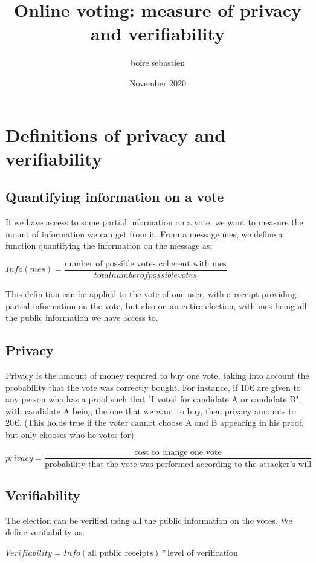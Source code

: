 \documentclass{article}
\title{Online voting: measure of privacy and verifiability}
\author{boire.sebastien }
\date{November 2020}
\begin{document}
\maketitle


\section{Definitions of privacy and verifiability}

\subsection{Quantifying information on a vote}

If we have access to some partial information on a vote, we want to measure the mount of information we can get from it. From a message mes, we define a function quantifying the information on the message as:

$Info(mes)=\dfrac{\text{number of possible votes coherent with mes}}{total number of possible votes}$

This definition can be applied to the vote of one user, with a receipt providing partial information on the vote, but also on an entire election, with mes being all the public information we have access to.


\subsection{Privacy}

Privacy is the amount of money required to buy one vote, taking into account the probability that the vote was correctly bought. For instance, if 10€ are given to any person who has a proof such that "I voted for candidate A or candidate B", with candidate A being the one that we want to buy, then privacy amounts to 20€. (This holds true if the voter cannot choose A and B appearing in his proof, but only chooses who he votes for).


$privacy=\dfrac{\text{cost to change one vote}}{\text{probability that the vote was performed according to the attacker's will}}$


\subsection{Verifiability}

The election can be verified using all the public information on the votes. We define verifiability as:

$Verifiability=Info(\text{all public receipts})*\text{level of verification}$
\end{document}
